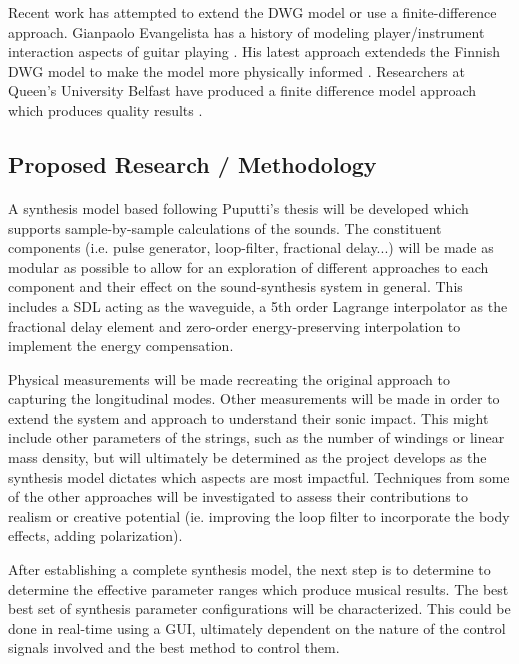 \documentclass[12pt]{article}
\begin{document}
Recent work has attempted to extend the DWG model or use a finite-difference approach. Gianpaolo Evangelista has a history of modeling player/instrument interaction aspects of guitar playing \cite{evangelista_physical_2011} \cite{evangelista_playerinstrument_2010}. His latest approach extendeds the Finnish DWG model to make the model more physically informed \cite{evangelista_physical_2012}. Researchers at Queen’s University Belfast have produced a finite difference model approach which produces quality results \cite{bhanuprakash_finite_2020}.

\subsection*{Proposed Research / Methodology}
\paragraph{}
A synthesis model based following Puputti's thesis will be developed which supports sample-by-sample calculations of the sounds. The constituent components (i.e. pulse generator, loop-filter, fractional delay...) will be made as modular as possible to allow for an exploration of different approaches to each component and their effect on the sound-synthesis system in general. This includes a SDL acting as the waveguide, a 5th order Lagrange interpolator as the fractional delay element and zero-order energy-preserving interpolation to implement the energy compensation.

Physical measurements will be made recreating the original approach to capturing the longitudinal modes. Other measurements will be made in order to extend the system and approach to understand their sonic impact. This might include other parameters of the strings, such as the number of windings or linear mass density, but will ultimately be determined as the project develops as the synthesis model dictates which aspects are most impactful. Techniques from some of the other approaches will be investigated to assess their contributions to realism or creative potential (ie. improving the loop filter to incorporate the body effects, adding polarization).

After establishing a complete synthesis model, the next step is to determine to determine the effective parameter ranges which produce musical results. The best best set of synthesis parameter configurations will be characterized. This could be done in real-time using a GUI, ultimately dependent on the nature of the control signals involved and the best method to control them.
\end{document}
